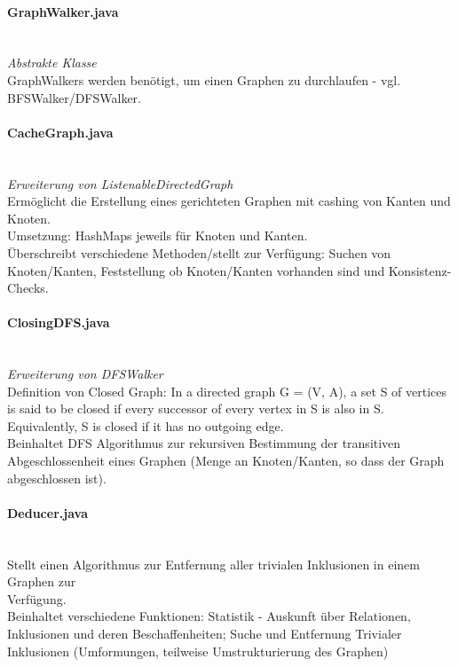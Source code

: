 \documentclass[10pt,a4paper]{article}
\begin{document}
\paragraph{GraphWalker.java}\ \\
\emph{Abstrakte Klasse}\\
GraphWalkers werden benötigt, um einen Graphen zu durchlaufen - vgl. BFSWalker/DFSWalker. \\

\paragraph{CacheGraph.java}\ \\
\emph{Erweiterung von ListenableDirectedGraph}\\
Ermöglicht die Erstellung eines gerichteten Graphen mit cashing von Kanten und Knoten.\\
Umsetzung: HashMaps jeweils für Knoten und Kanten.\\
Überschreibt verschiedene Methoden/stellt zur Verfügung: Suchen von Knoten/Kanten, Feststellung ob Knoten/Kanten vorhanden sind und Konsistenz-Checks.\\

\paragraph{ClosingDFS.java}\ \\
\emph{Erweiterung von DFSWalker}\\
Definition von Closed Graph: In a directed graph G = (V, A), a set S of vertices is said to be closed if every successor of every vertex in S is also in S. Equivalently, S is closed if it has no outgoing edge.\\
Beinhaltet DFS Algorithmus zur rekursiven Bestimmung der transitiven Abgeschlossenheit eines Graphen (Menge an Knoten/Kanten, so dass der Graph abgeschlossen ist).\\

\paragraph{Deducer.java}\ \\
Stellt einen Algorithmus zur Entfernung aller trivialen Inklusionen in einem Graphen zur \\Verfügung.\\
Beinhaltet verschiedene Funktionen: Statistik - Auskunft über Relationen, Inklusionen und deren Beschaffenheiten; Suche und Entfernung Trivialer Inklusionen (Umformungen, teilweise Umstrukturierung des Graphen)\\
\end{document}
